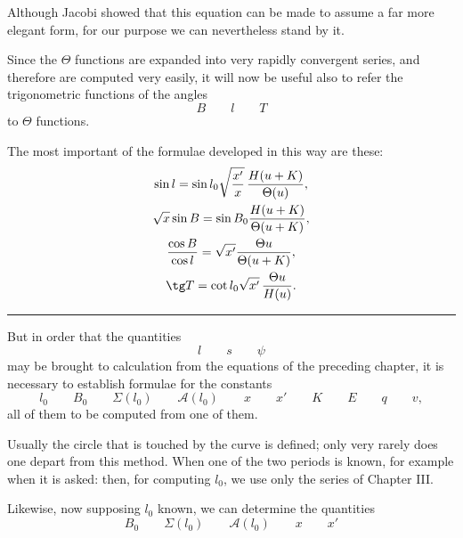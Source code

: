 \begingroup\small
Although Jacobi showed that this equation can be made to assume a far more elegant form, for our purpose we can nevertheless stand by it.


Since the $\Theta$ functions are expanded into very rapidly convergent series, and therefore are computed very easily, it will now be useful also to refer the trigonometric functions of the angles
\[
 B\qquad l\qquad T
\]
to $\Theta$ functions.

The most important of the formulae developed in this way are these:
\[
\begin{gathered}
 \sin l=\sin l_0\sqrt{x'\over x}\,{H(u+K)\over\Theta(u)},\\
 \sqrt{x}\sin B=\sin B_0{H(u+K)\over\Theta(u+K)},\\
 {\cos B\over\cos l}=\sqrt{x'}{\Theta u\over\Theta(u+K)},\\
 \tg T=\cot l_0\sqrt{x'}\,{\Theta u\over H(u)}.
\end{gathered}
\]

\rule{0.35\textwidth}{0.4pt}


But in order that the quantities
\[
 l\qquad s\qquad \psi
\]
may be brought to calculation from the equations of the preceding chapter, it is necessary to establish formulae for the constants
\[
 l_0\qquad B_0\qquad \Sigma(l_0)\qquad \mathcal A(l_0)\qquad x\qquad x'\qquad K\qquad E\qquad q\qquad v,
\]
all of them to be computed from one of them.


Usually the circle that is touched by the curve is defined; only very rarely does one depart from this method. When one of the two periods is known, for example when it is asked:  then, for computing $l_0$, we use only the series of Chapter III.


Likewise, now supposing $l_0$ known, we can determine the quantities
\[
 B_0\qquad \Sigma(l_0)\qquad \mathcal A(l_0)\qquad x\qquad x'
\]
\endgroup
